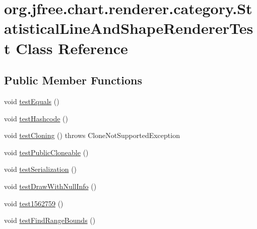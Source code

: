 \hypertarget{classorg_1_1jfree_1_1chart_1_1renderer_1_1category_1_1_statistical_line_and_shape_renderer_test}{}\section{org.\+jfree.\+chart.\+renderer.\+category.\+Statistical\+Line\+And\+Shape\+Renderer\+Test Class Reference}
\label{classorg_1_1jfree_1_1chart_1_1renderer_1_1category_1_1_statistical_line_and_shape_renderer_test}
\subsection*{Public Member Functions}
\begin{DoxyCompactItemize}
\item 
void \mbox{\hyperlink{classorg_1_1jfree_1_1chart_1_1renderer_1_1category_1_1_statistical_line_and_shape_renderer_test_a38df4357e3adb7dabfc71bb7fbccb354}{test\+Equals}} ()
\item 
void \mbox{\hyperlink{classorg_1_1jfree_1_1chart_1_1renderer_1_1category_1_1_statistical_line_and_shape_renderer_test_a920bc8ce644e35d74bb73de6eaeb0b6f}{test\+Hashcode}} ()
\item 
void \mbox{\hyperlink{classorg_1_1jfree_1_1chart_1_1renderer_1_1category_1_1_statistical_line_and_shape_renderer_test_acbd526eb0d3ee8deb149b7157f24d9e0}{test\+Cloning}} ()  throws Clone\+Not\+Supported\+Exception 
\item 
void \mbox{\hyperlink{classorg_1_1jfree_1_1chart_1_1renderer_1_1category_1_1_statistical_line_and_shape_renderer_test_a8d668f9afbec0fa3cd33dd7ffbb406bd}{test\+Public\+Cloneable}} ()
\item 
void \mbox{\hyperlink{classorg_1_1jfree_1_1chart_1_1renderer_1_1category_1_1_statistical_line_and_shape_renderer_test_a55aded98e8967c099330544bbf352952}{test\+Serialization}} ()
\item 
void \mbox{\hyperlink{classorg_1_1jfree_1_1chart_1_1renderer_1_1category_1_1_statistical_line_and_shape_renderer_test_afc378bd3f00513018ce5fd8a7e079671}{test\+Draw\+With\+Null\+Info}} ()
\item 
void \mbox{\hyperlink{classorg_1_1jfree_1_1chart_1_1renderer_1_1category_1_1_statistical_line_and_shape_renderer_test_aabc3a71942f08a03a79982308be4f78e}{test1562759}} ()
\item 
void \mbox{\hyperlink{classorg_1_1jfree_1_1chart_1_1renderer_1_1category_1_1_statistical_line_and_shape_renderer_test_ae77d352e35e3038ff4c1f685d00cf6a8}{test\+Find\+Range\+Bounds}} ()
\end{DoxyCompactItemize}


